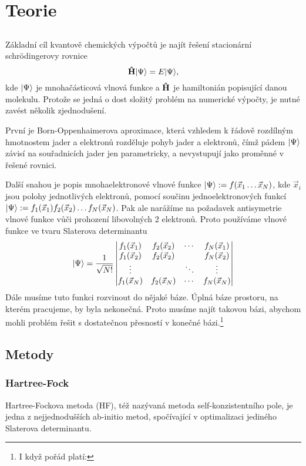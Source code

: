 \chapter{Teorie}
\section{}
Základní cíl kvantově chemických výpočtů je najít řešení stacionární schrödingerovy rovnice
\begin{equation}
\mathbf{\hat{H}}| \Psi \rangle = E| \Psi \rangle,
\end{equation}
kde $| \Psi \rangle$ je mnohačásticová vlnová funkce a $\mathbf{\hat{H}}$ je hamiltonián popisující 
danou molekulu.
Protože se jedná o dost složitý problém na numerické výpočty, je nutné zavést 
několik zjednodušení. 

První je Born-Oppenhaimerova aproximace, která vzhledem k řádově 
rozdílným hmotnostem jader a elektronů rozděluje pohyb jader a elektronů, čímž pádem 
$| \Psi \rangle$ závisí na souřadnicích jader jen parametricky, 
a nevystupují jako proměnné v 
řešené rovnici. 

Další snahou je popis mnohaelektronové vlnové funkce
$| \Psi \rangle:= f(\vec{x}_1 \dots \vec{x}_N)$, kde $\vec{x}_i$ jsou 
polohy jednotlivých elektronů, pomocí součinu jednoelektronových funkcí
$| \Psi \rangle:= f_1(\vec{x}_1)f_2(\vec{x}_2)\dots f_N(\vec{x}_N)$.
Pak ale narážíme na požadavek antisymetrie vlnové funkce vůči prohození libovolných 2 
elektronů. Proto používáme vlnové funkce ve tvaru Slaterova determinantu
\begin{equation}
| \Psi \rangle = \frac{1}{\sqrt{N!}}\begin{vmatrix}
f_1(\vec{x}_1) & f_2(\vec{x}_2)& \cdots & f_N(\vec{x}_1) \\
f_1(\vec{x}_2) & f_2(\vec{x}_2)&        & f_N(\vec{x}_2)\\
\vdots         &               & \ddots & \vdots \\
f_1(\vec{x}_N) & f_2(\vec{x}_N)& \cdots & f_N(\vec{x}_N)
\end{vmatrix}
\end{equation}
Dále musíme tuto funkci rozvinout do nějaké báze. Úplná báze prostoru, na kterém pracujeme, by byla nekonečná. Proto musíme najít takovou bázi, abychom mohli problém řešit s dostatečnou přesností v konečné bázi.\footnote{I když pořád platí: }
\section{Metody}
\subsection{Hartree-Fock}
Hartree-Fockova metoda (HF), též nazývaná metoda self-konzistentního pole, je jedna z nejjednodušších ab-initio metod, spočívající v optimalizaci jediného Slaterova determinantu.
